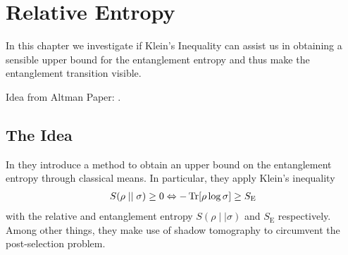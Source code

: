\chapter{Relative Entropy}
\label{ch:rel-ent}

In this chapter we investigate if Klein's Inequality can assist us in obtaining
a sensible upper bound for the entanglement entropy and thus make the
entanglement transition visible.

Idea from Altman Paper:
\cite{garrattProbingPostmeasurementEntanglement2023}.
\section{The Idea}
In \cite{garrattProbingPostmeasurementEntanglement2023} they introduce a method to obtain an upper bound on the
entanglement entropy through classical means. In particular, they apply Klein's
inequality \cite{nielsenQuantumComputationQuantum2010}
\begin{align}
  \label{eq:kleins-ineq}
  S(\rho \mid\mid \sigma) \geq 0 \Leftrightarrow -\Tr[\rho\log\sigma]\geq
  S_\mathrm{E}
\end{align}
with the relative and entanglement entropy $S(\rho\mid\mid\sigma)$ and
$S_\mathrm{E}$ respectively.
Among other things, they make use of shadow tomography to circumvent the
post-selection problem. 

%

